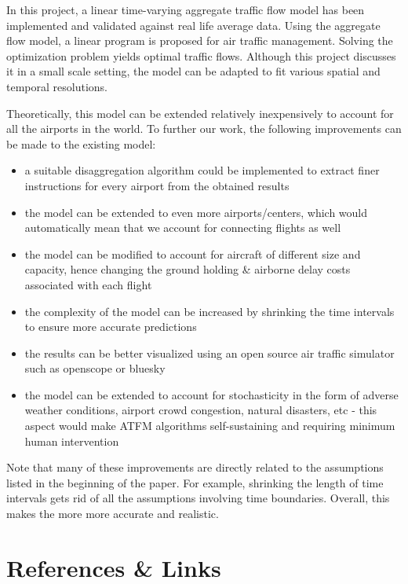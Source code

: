 \documentclass[conference]{IEEEtran}
\begin{document}
In this project, a linear time-varying aggregate traffic flow model has been implemented and validated against real life average data. Using the aggregate flow model, a linear program is proposed for air traffic management. Solving the optimization problem yields optimal traffic flows. Although this project discusses it in a small scale setting, the model can be adapted to fit various spatial and temporal resolutions.
\vspace{2mm}

Theoretically, this model can be extended relatively inexpensively to account for all the airports in the world. To further our work, the following improvements can be made to the existing model:

\begin{itemize}
    \item a suitable disaggregation algorithm could be implemented to extract finer instructions for every airport from the obtained results
    \item the model can be extended to even more airports/centers, which would automatically mean that we account for connecting flights as well
    \item the model can be modified to account for aircraft of different size and capacity, hence changing the ground holding \& airborne delay costs associated with each flight
    \item the complexity of the model can be increased by shrinking the time intervals to ensure more accurate predictions
    \item the results can be better visualized using an open source air traffic simulator such as openscope or bluesky
    \item the model can be extended to account for stochasticity in the form of adverse weather conditions, airport crowd congestion, natural disasters, etc - this aspect would make ATFM algorithms self-sustaining and requiring minimum human intervention
\end{itemize}
\vspace{1mm}

Note that many of these improvements are directly related to the assumptions listed in the beginning of the paper. For example, shrinking the length of time intervals gets rid of all the assumptions involving time boundaries. Overall, this makes the more more accurate and realistic.
\newpage

\section{\large References \& Links}
\label{sec:sec8}
\vspace{2mm}
\end{document}
